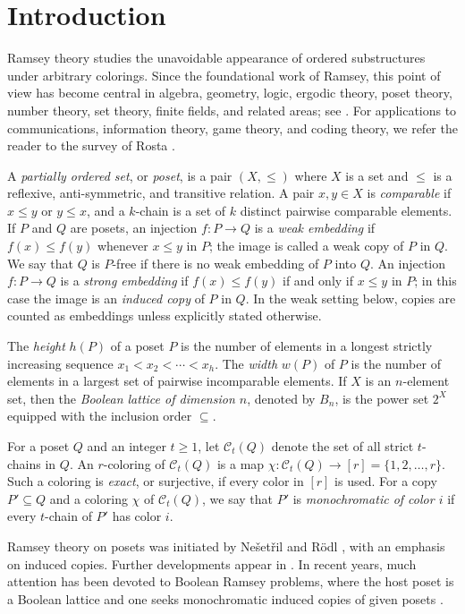 \documentclass[twoside,12pt]{article}
\begin{document}
\section{Introduction}

Ramsey theory studies the unavoidable appearance of ordered substructures under arbitrary colorings. Since the foundational work of Ramsey, this point of view has become central in algebra, geometry, logic, ergodic theory, poset theory, number theory, set theory, finite fields, and related areas; see \cite{GRS90}. For applications to communications, information theory, game theory, and coding theory, we refer the reader to the survey of Rosta \cite{Rosta04}.

A \emph{partially ordered set}, or \emph{poset}, is a pair $(X,\leq)$ where $X$ is a set and $\leq$ is a reflexive, anti-symmetric, and transitive relation. A pair $x,y\in X$ is \emph{comparable} if $x\leq y$ or $y\leq x$, and a $k$-chain is a set of $k$ distinct pairwise comparable elements. If $P$ and $Q$ are posets, an injection $f:P\rightarrow Q$ is a \emph{weak embedding} if $f(x)\leq f(y)$ whenever $x\leq y$ in $P$; the image is called a weak copy of $P$ in $Q$. We say that $Q$ is $P$-free if there is no weak embedding of $P$ into $Q$. An injection $f:P\rightarrow Q$ is a \emph{strong embedding} if $f(x)\leq f(y)$ if and only if $x\leq y$ in $P$; in this case the image is an \emph{induced copy} of $P$ in $Q$. In the weak setting below, copies are counted as embeddings unless explicitly stated otherwise.

The \emph{height} $h(P)$ of a poset $P$ is the number of elements in a longest strictly increasing sequence $x_1<x_2<\cdots<x_h$. The \emph{width} $w(P)$ of $P$ is the number of elements in a largest set of pairwise incomparable elements. If $X$ is an $n$-element set, then the \emph{Boolean lattice of dimension $n$}, denoted by $B_n$, is the power set $2^X$ equipped with the inclusion order $\subseteq$.

For a poset $Q$ and an integer $t\geq1$, let $\mathcal C_t(Q)$ denote the set of all strict $t$-chains in $Q$. An $r$-coloring of $\mathcal C_t(Q)$ is a map $\chi:\mathcal C_t(Q)\rightarrow[r]=\{1,2,\ldots,r\}$. Such a coloring is \emph{exact}, or surjective, if every color in $[r]$ is used. For a copy $P'\subseteq Q$ and a coloring $\chi$ of $\mathcal C_t(Q)$, we say that $P'$ is \emph{monochromatic of color $i$} if every $t$-chain of $P'$ has color $i$.

Ramsey theory on posets was initiated by Ne\v{s}et\v{r}il and R\"odl \cite{NR84}, with an emphasis on induced copies. Further developments appear in \cite{DKT91,LT22,McColm91,TrotterRamsey}. In recent years, much attention has been devoted to Boolean Ramsey problems, where the host poset is a Boolean lattice and one seeks monochromatic induced copies of given posets \cite{AW17,CS18,GRS99,JLM15}.
\end{document}
